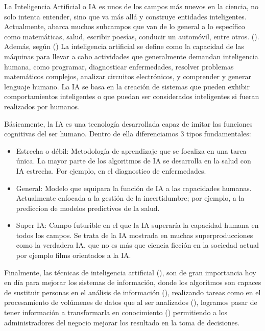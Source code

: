 La Inteligencia Artificial o IA es unos de los campos más nuevos en la ciencia, no solo intenta entender, sino que va más allá y construye entidades inteligentes. Actualmente, abarca muchos subcampos que van de lo general a lo específico como matemáticas, salud, escribir poesías, conducir un automóvil, entre otros. (\cite{russel2010ai}). Además, según (\cite{utnfrbam2021}) La inteligencia artificial se define como la capacidad de las máquinas para llevar a cabo actividades que generalmente demandan inteligencia humana, como programar, diagnosticar enfermedades, resolver problemas matemáticos complejos, analizar circuitos electrónicos, y comprender y generar lenguaje humano. La IA se basa en la creación de sistemas que pueden exhibir comportamientos inteligentes o que puedan ser considerados inteligentes si fueran realizados por humanos.

Básicamente, la IA es una tecnología desarrollada capaz de imitar las funciones cognitivas del ser humano. Dentro de ella diferenciamos 3 tipos fundamentales:
\begin{itemize}
    \item Estrecha o débil: Metodología de aprendizaje que se focaliza en una tarea única. La mayor parte de los algoritmos de IA se desarrolla en la salud con IA estrecha. Por ejemplo, en el diagnostico de enfermedades.
    \item General: Modelo que equipara la función de IA a las capacidades humanas. Actualmente enfocada a la gestión de la incertidumbre; por ejemplo, a la prediccion de modelos predictivos de la salud.
    \item Super IA: Campo futurible en el que la IA superaría la capacidad humana en todos los campos. Se trata de la IA mostrada en muchas superproducciones como la verdadera IA, que no es más que ciencia ficción en la sociedad actual por ejemplo films orientados a la IA.
\end{itemize}

Finalmente, las técnicas de inteligencia artificial (\cite{heredia2015ai}), son de gran importancia hoy en día para mejorar los sistemas de información, donde los algoritmos son capaces de sustituir personas en el análisis de información (\cite{massa2018ai}), realizando tareas como en el procesamiento de volúmenes de datos que al ser analizados (\cite{bobadilla2019data}), logramos  pasar de tener información a transformarla en conocimiento (\cite{garcia2018knowledge}) permitiendo a los administradores del negocio  mejorar los resultado en la toma de decisiones.

